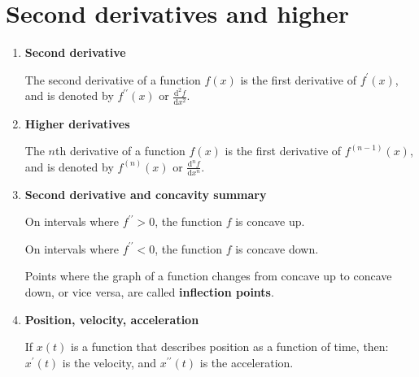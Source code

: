 \section{Second derivatives and higher}
\begin{enumerate}
    \item \textbf{Second derivative}

        The second derivative of a function $f(x)$ is the first derivative of $f^\prime(x)$, and is denoted by $f^{\prime\prime}(x)$ or $\frac{\mathrm{d}^2 f}{\mathrm{d}x^2}$.
    \item \textbf{Higher derivatives}

        The $n$th derivative of a function $f(x)$ is the first derivative of $f^{(n-1)}(x)$, and is denoted by $f^{(n)}(x)$ or $\frac{\mathrm{d}^n f}{\mathrm{d} x^n}$.
    \item \textbf{Second derivative and concavity summary}
        
        On intervals where $f^{\prime\prime}>0$, the function $f$ is concave up.
        \begin{figure}[H]
            \centering
        \end{figure}

        On intervals where $f^{\prime\prime}<0$, the function $f$ is concave down.
        \begin{figure}[H]
            \centering
        \end{figure}

        Points where the graph of a function changes from concave up to concave down, or vice versa, are called \textbf{inflection points}.
    \item \textbf{Position, velocity, acceleration}

        If $x(t)$ is a function that describes position as a function of time, then:
        $x^\prime (t)$ is the velocity, and $x^{\prime\prime} (t)$ is the acceleration.
\end{enumerate}


